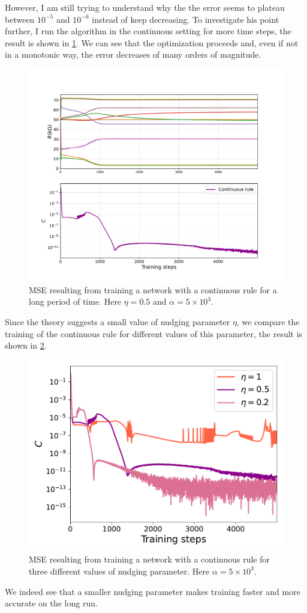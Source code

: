 \documentclass[10.5pt]{article}
\begin{document}
However, I am still trying to understand why the the error seems to plateau between $10^{-5}$ and $10^{-6}$ instead of keep decreasing. To investigate his point further, I run the algorithm in the continuous setting for more time steps, the result is shown in \cref{fig:continuous_long}. We can see that the optimization proceeds and, even if not in a monotonic way, the error decreases of many orders of magnitude.
\begin{figure}[h]
    \centering
    \includegraphics[width=0.5\columnwidth]{../figures_tex/continuous_long.pdf}
    \caption{MSE resulting from training a network with a continuous rule for a long period of time. Here $\eta = 0.5$ and $\alpha = 5 \times 10^3$.}
    \label{fig:continuous_long}
\end{figure}
Since the theory suggests a small value of nudging parameter $\eta$, we compare the training of the continuous rule for different values of this parameter, the result is shown in \cref{fig:general_etas}. 
\begin{figure}[h]
    \centering
    \includegraphics[width=0.5\columnwidth]{../figures_tex/general_etas.pdf}
    \caption{MSE resulting from training a network with a continuous rule for three different values of nudging parameter. Here $\alpha = 5 \times 10^3$.}
    \label{fig:general_etas}
\end{figure}
We indeed see that a smaller nudging parameter makes training faster and more accurate on the long run.
\end{document}
